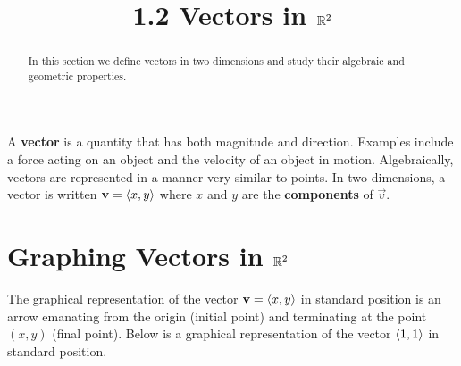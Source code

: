 \documentclass[handout]{ximera}
\title{1.2 Vectors in $\mathbb R^2$}
\begin{document}
\begin{abstract}
In this section we define vectors in two dimensions and study their algebraic and geometric properties.
\end{abstract}
 
\maketitle

A {\bf vector} is a quantity that has both magnitude and direction. Examples include a force acting on an object and the velocity of an object in motion.
Algebraically, vectors are represented in a manner very similar to points.  In two dimensions, a vector is written $\mathbf{v} = \left\langle x,y\right\rangle$  
where $x$ and $y$ are the {\bf components} of $\vec{v}$.


\section{Graphing Vectors in $\mathbb R^2$}
The graphical representation of the vector $\mathbf{v} = \left\langle x,y\right\rangle$ in standard position
is an arrow emanating from the origin (initial point) and terminating at the point $(x,y)$ (final point).
Below is a graphical representation of the vector $\left\langle 1,1\right\rangle$ in standard position.

\begin{image}
\end{image}
\end{document}
